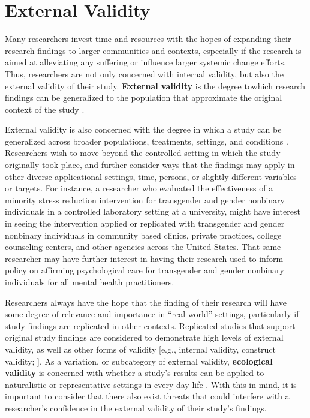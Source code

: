 \documentclass[
  11pt,
]{book}
\begin{document}
\section{External Validity}\label{external-validity}

Many researchers invest time and resources with the hopes of expanding their research findings to larger communities and contexts, especially if the research is aimed at alleviating any suffering or influence larger systemic change efforts. Thus, researchers are not only concerned with internal validity, but also the external validity of their study. \textbf{External validity} is the degree towhich research findings can be generalized to the population that approximate the original context of the study \citep{campbell_experimental_1963, cook_quasi-experimentation_1979, fabrigar_validity-based_2020, shadish_experimental_2002}.

External validity is also concerned with the degree in which a study can be generalized across broader populations, treatments, settings, and conditions \citep{ferguson_external_2004}. Researchers wish to move beyond the controlled setting in which the study originally took place, and further consider ways that the findings may apply in other diverse applicational settings, time, persons, or slightly different variables or targets\citep{kenny_enhancing_2019, shadish_experimental_2002}. For instance, a researcher who evaluated the effectiveness of a minority stress reduction intervention for transgender and gender nonbinary individuals in a controlled laboratory setting at a university, might have interest in seeing the intervention applied or replicated with transgender and gender nonbinary individuals in community based clinics, private practices, college counseling centers, and other agencies across the United States. That same researcher may have further interest in having their research used to inform policy on affirming psychological care for transgender and gender nonbinary individuals for all mental health practitioners.

Researchers always have the hope that the finding of their research will have some degree of relevance and importance in ``real-world'' settings, particularly if study findings are replicated in other contexts. Replicated studies that support original study findings are considered to demonstrate high levels of external validity, as well as other forms of validity {[}e.g., internal validity, construct validity; \citet{fabrigar_validity-based_2020}{]}. As a variation, or subcategory of external validity, \textbf{ecological validity} is concerned with whether a study's results can be applied to naturalistic or representative settings in every-day life \citep{andrade_internal_2018, schmuckler_what_2001}. With this in mind, it is important to consider that there also exist threats that could interfere with a researcher's confidence in the external validity of their study's findings.
\end{document}
